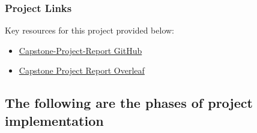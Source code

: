 \documentclass[runningheads]{llncs}
\begin{document}
\subsubsection*{Project Links}
Key resources for this project provided below:

\begin{itemize}
    \item \href{https://github.com/alvaroquintero28/Capstone-Project-Report}{Capstone-Project-Report GitHub}
    \item \href{https://es.overleaf.com/read/zqgzcfntnwbz#9bc8ce}
    {Capstone Project Report Overleaf}
\end{itemize}

\subsection{The following are the phases of project implementation}
\end{document}
